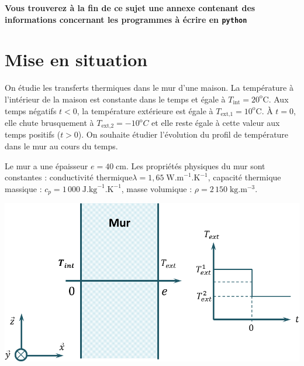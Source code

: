 
\ifprof
\else

\textbf{Vous trouverez à la fin de ce sujet une annexe contenant des informations concernant les programmes à écrire en 
\texttt{python}}
\fi

\section{Mise en situation}
\ifprof
\else
\vspace{.25cm}

\noindent \begin{minipage}[c]{.5\linewidth}
On étudie les transferts thermiques dans le mur d’une maison. La température à
l'intérieur de la maison est constante dans le temps et égale à $T_{\text{int}}=20^{\text{o}} \text{C}$. Aux temps 
négatifs $t<0$, la température extérieure est égale à $T_{\text{ext,1}}=10^{\text{o}} \text{C}$. À $t=0$, elle chute 
brusquement à $T_{\text{ext,2}}=-10^{\text{o}} C$ et elle reste égale à cette valeur aux temps positifs ($t>0$). On
souhaite étudier l'évolution du profil de température dans le mur au cours du temps.

Le mur a une épaisseur $e=40\;\text{cm}$. Les propriétés physiques du mur sont constantes : conductivité 
thermique$\lambda = 1,65\; \text{W.m}^{-1}.\text{K}^{-1}$, capacité thermique massique : $c_p = 1\, 000\; 
\text{J}.\text{kg}^{-1}.\text{K}^{-1}$, masse volumique : $\rho = 2\, 150 \; \text{kg}.\text{m}^{-3}$. 

\end{minipage} \hfill
\begin{minipage}[c]{.5\linewidth}
\begin{center}
\includegraphics[width=\linewidth]{images/figure_01}
\end{center}
\end{minipage}

